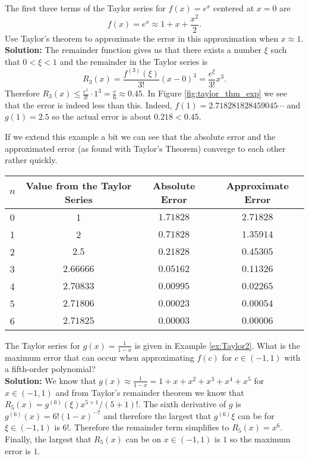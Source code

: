\begin{example}
    The first three terms of the Taylor series for $f(x) = e^x$ centered at $x=0$ are \[
    f(x) = e^x \approx 1 + x + \frac{x^2}{2}. \] Use Taylor's theorem to approximate the
    error in this approximation when $x \approx 1$. \\ {\bf Solution:}
    The remainder function gives us that there exists a number
    $\xi$ such that $0 < \xi < 1$ and the remainder in the Taylor series
    is \[ R_3(x) = \frac{f^{(3)}(\xi)}{3!}(x-0)^3 = \frac{e^\xi}{3!}x^3.
    \] Therefore $R_3(x) \le \frac{e^1}{3!} \cdot 1^3 = \frac{e}{6}
    \approx 0.45$. In Figure \ref{fig:taylor_thm_exp} we see that the
    error is indeed less than this.  Indeed, $f(1) =
    2.718281828459045\cdots$ and $g(1) = 2.5$ so the actual error is about
    $0.218 < 0.45$.

    If we extend this example a bit we can see that the absolute error and the
    approximated error (as found with Taylor's Theorem) converge to each other rather
    quickly.  
    \begin{center}
        \begin{tabular}{|c|c|c|c|}
            \hline
            $n$ & Value from the Taylor Series & Absolute Error & Approximate Error \\ \hline \hline
            0 & 1 & $1.71828$ & $2.71828$ \\ \hline
            1 & 2 & $0.71828$ & $1.35914$ \\ \hline
            2 & $2.5$ & $0.21828$ & $0.45305$\\ \hline
            3 & $2.66666$ & $0.05162$ & $0.11326$ \\ \hline
            4 & $2.70833$ & $0.00995$ & $0.02265$ \\ \hline
            5 & $2.71806$ & $0.00023$ & $0.00054$ \\ \hline
            6 & $2.71825$ & $0.00003$ & $0.00006$ \\ \hline
        \end{tabular}
    \end{center}
\end{example}

\begin{example}
    The Taylor series for $g(x) = \frac{1}{1-x}$ is given in Example \ref{ex:Taylor2}.
    What is the maximum error that can occur when approximating $f(c)$ for $c \in (-1,1)$
    with a fifth-order polynomial? \\{\bf Solution:}  
    We know that $g(x) \approx \frac{1}{1-x} = 1+x+x^2 + x^3 + x^4
    + x^5$ for $x \in (-1,1)$ and from Taylor's remainder theorem we know
    that $R_5(x) = g^{(6)}(\xi) x^{5+1} / (5+1)!$.  The sixth derivative
    of $g$ is $g^{(6)}(x) = 6! (1-x)^{-7}$ and therefore the largest that
    $g^{(6)}{\xi}$ can be for $\xi \in (-1,1)$ is $6!$.  Therefore the
    remainder term simplifies to $R_5(x) = x^6$.  Finally, the largest that
    $R_5(x)$ can be on $x \in (-1,1)$ is $1$ so the maximum error is $1$.
\end{example}

